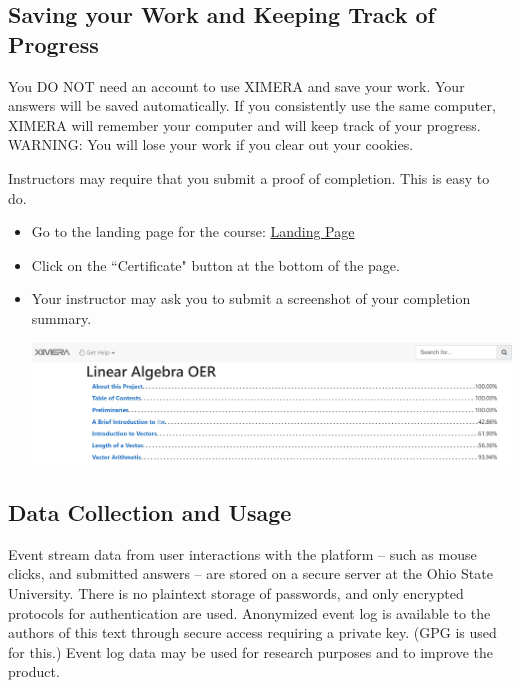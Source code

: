 \documentclass{ximera}
\begin{document}
\begin{onlineOnly}
\begin{center}
\end{center}
\end{onlineOnly}

\subsection*{Saving your Work and Keeping Track of Progress}
You DO NOT need an account to use XIMERA and save your work.
Your answers will be saved automatically.  If you consistently use the same computer, XIMERA will remember your computer and will keep track of your progress.   WARNING: You will lose your work if you clear out your cookies.

Instructors may require that you submit a proof of completion.  This is easy to do. 
\begin{itemize}
    \item Go to the landing page for the course: \href{https://ximera.osu.edu/qcstats/QC_stats}{Landing Page}
    
\item Click on the ``Certificate" button at the bottom of the page.

\item
Your instructor may ask you to submit a screenshot of your completion summary.
\begin{image}
\includegraphics{ximeraScreenshot3.jpg}
\end{image}
\end{itemize}
\subsection*{Data Collection and Usage}
Event stream data from user interactions with the platform -- such as mouse clicks, and submitted answers -- are stored on a secure server at the Ohio State University.  There is no plaintext storage of passwords, and only encrypted protocols for authentication are used.  Anonymized event log is available to the authors of this text through secure access requiring a private key. (GPG is used for this.)   Event log data may be used for research purposes and to improve the product.
\end{document}
